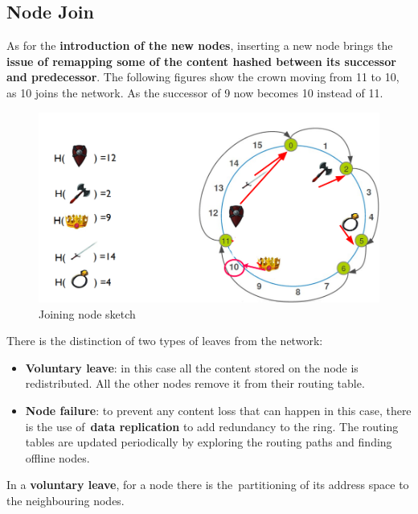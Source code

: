 \documentclass[10pt,a4paper]{report}
\begin{document}
\subsection{Node Join}\label{sec:node-join}
As for the \textbf{introduction of the new nodes}, inserting a new node brings the \textbf{issue of remapping some of the content hashed between its successor and predecessor}. The following figures show the crown moving from 11 to 10, as 10 joins the network. As the successor of 9 now becomes 10 instead of 11.
\begin{figure}[h]
	\centering
	\includegraphics[scale=0.40]{images/Pasted image 20230303114516.png}
	\caption{Joining node sketch}
	\label{chord-join}
\end{figure}


There is the distinction of two types of leaves from the network:
\begin{itemize}
	\item 
	\textbf{Voluntary leave}: in this case all the content stored on the node is redistributed. All the other nodes remove it from their routing table.
	\item 
	\textbf{Node failure}: to prevent any content loss that can happen in this case, there is the use of \textbf{data replication} to add redundancy to the ring. The routing tables are updated periodically by exploring the routing paths and finding offline nodes.
	
\end{itemize}
In a \textbf{voluntary leave}, for a node there is the partitioning of its address space to the neighbouring nodes.
\end{document}
